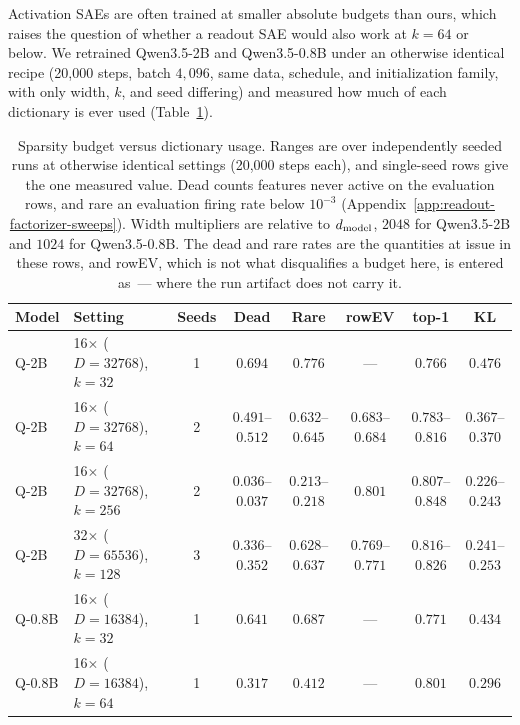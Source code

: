 Activation SAEs are often trained at smaller absolute budgets than ours,
which raises the question of whether a readout SAE would also work at
$k=64$ or below. We retrained Qwen3.5-2B and Qwen3.5-0.8B under an
otherwise identical recipe
(20{,}000 steps, batch $4{,}096$, same data, schedule, and
initialization family, with only width, $k$, and seed differing) and measured
how much of each dictionary is ever used
(Table~\ref{tab:app-low-k-dead-features}).

\begin{table}[!tbp]
\caption{Sparsity budget versus dictionary usage. Ranges
are over independently seeded runs at otherwise identical settings
(20{,}000 steps each), and single-seed rows give the one measured value.
Dead counts features never active on the evaluation
rows, and rare an evaluation firing rate below $10^{-3}$
(Appendix~\ref{app:readout-factorizer-sweeps}). Width multipliers are
relative to $d_{\mathrm{model}}$, $2048$ for Qwen3.5-2B and $1024$ for
Qwen3.5-0.8B. The dead and rare rates are the quantities at issue in
these rows, and rowEV, which is not what disqualifies a budget here, is
entered as~--- where the run artifact does not carry it.}
\label{tab:app-low-k-dead-features}
\centering
\footnotesize
\setlength{\tabcolsep}{5pt}
\renewcommand{\arraystretch}{1.08}
\begin{tabular}{@{}llcccccc@{}}
\toprule
Model & Setting & Seeds & Dead & Rare & rowEV & top-1 & KL \\
\midrule
Q-2B & 16$\times$ ($D=32768$), $k=32$ & 1 & $0.694$ & $0.776$ & --- & $0.766$ & $0.476$ \\
Q-2B & 16$\times$ ($D=32768$), $k=64$ & 2 & $0.491$--$0.512$ & $0.632$--$0.645$ & $0.683$--$0.684$ & $0.783$--$0.816$ & $0.367$--$0.370$ \\
Q-2B & 16$\times$ ($D=32768$), $k=256$ & 2 & $0.036$--$0.037$ & $0.213$--$0.218$ & $0.801$ & $0.807$--$0.848$ & $0.226$--$0.243$ \\
Q-2B & 32$\times$ ($D=65536$), $k=128$ & 3 & $0.336$--$0.352$ & $0.628$--$0.637$ & $0.769$--$0.771$ & $0.816$--$0.826$ & $0.241$--$0.253$ \\
\midrule
Q-0.8B & 16$\times$ ($D=16384$), $k=32$ & 1 & $0.641$ & $0.687$ & --- & $0.771$ & $0.434$ \\
Q-0.8B & 16$\times$ ($D=16384$), $k=64$ & 1 & $0.317$ & $0.412$ & --- & $0.801$ & $0.296$ \\
\bottomrule
\end{tabular}
\end{table}

